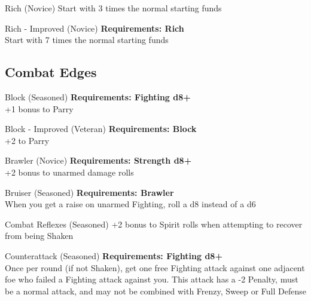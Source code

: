 \begin{multicols}{2}
\begin{genericsection}{Rich (Novice)}
Start with 3 times the normal starting funds
\end{genericsection}

\begin{genericsection}{Rich - Improved (Novice)}
\textbf{Requirements: Rich}\\
Start with 7 times the normal starting funds
\end{genericsection}

%
%
\subsection{Combat Edges}

\begin{genericsection}{Block (Seasoned)}
\textbf{Requirements: Fighting d8+}\\
+1 bonus to Parry
\end{genericsection}

\begin{genericsection}{Block - Improved (Veteran)}
\textbf{Requirements: Block}\\
+2 to Parry
\end{genericsection}

\begin{genericsection}{Brawler (Novice)}
\textbf{Requirements: Strength d8+}\\
+2 bonus to unarmed damage rolls
\end{genericsection}

\begin{genericsection}{Bruiser (Seasoned)}
\textbf{Requirements: Brawler}\\
When you get a raise on unarmed Fighting, roll a d8 instead of a d6
\end{genericsection}

\begin{genericsection}{Combat Reflexes (Seasoned)}
+2 bonus to Spirit rolls when attempting to recover from being Shaken
\end{genericsection}

\begin{genericsection}{Counterattack (Seasoned)}
\textbf{Requirements: Fighting d8+}\\
Once per round (if not Shaken), get one free Fighting attack against one adjacent foe who failed a Fighting attack against you. This attack has a -2 Penalty, must be a normal attack, and may not be combined with Frenzy, Sweep or Full Defense
\end{genericsection}


\end{multicols}
